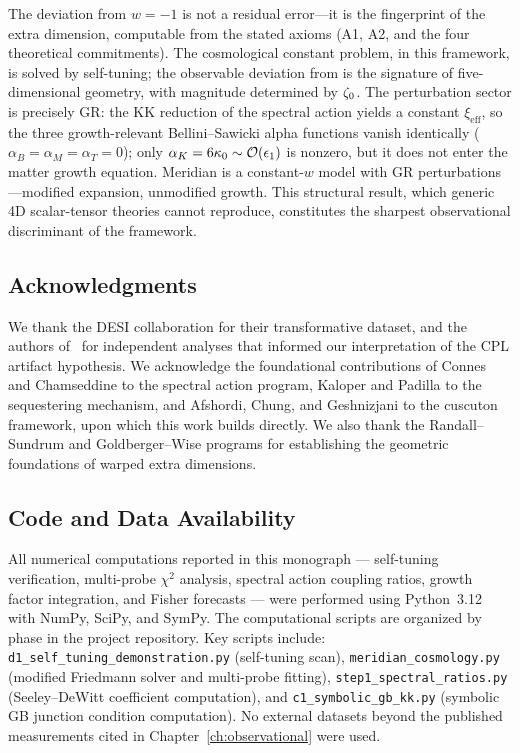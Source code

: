 The deviation from $w = -1$ is not a residual error---it is the fingerprint of the extra dimension, computable from the stated axioms (A1, A2, and the four theoretical commitments). The cosmological constant problem, in this framework, is solved by self-tuning; the observable deviation from \LCDM{} is the signature of five-dimensional geometry, with magnitude determined by $\zeta_0$. The perturbation sector is precisely GR: the KK reduction of the spectral action yields a constant $\xi_{\mathrm{eff}}$, so the three growth-relevant Bellini--Sawicki alpha functions vanish identically ($\alpha_B = \alpha_M = \alpha_T = 0$); only $\alpha_K = 6\kappa_0 \sim \mathcal{O}\!\left(\epsilon_1\right)$ is nonzero, but it does not enter the matter growth equation. Meridian is a constant-$w$ model with GR perturbations---modified expansion, unmodified growth. This structural result, which generic 4D scalar-tensor theories cannot reproduce, constitutes the sharpest observational discriminant of the framework.

\bigskip

\subsection*{Acknowledgments}

We thank the DESI collaboration for their transformative dataset, and the authors of~\cite{ch1:nesseris25,ch1:gomez25,ch1:lodha24,ch1:hasan25,ch1:mandal25,ch1:andrianomena25,ch1:marques25} for independent analyses that informed our interpretation of the CPL artifact hypothesis. We acknowledge the foundational contributions of Connes and Chamseddine to the spectral action program, Kaloper and Padilla to the sequestering mechanism, and Afshordi, Chung, and Geshnizjani to the cuscuton framework, upon which this work builds directly. We also thank the Randall--Sundrum and Goldberger--Wise programs for establishing the geometric foundations of warped extra dimensions.

\subsection*{Code and Data Availability}

All numerical computations reported in this monograph --- self-tuning verification, multi-probe $\chi^2$ analysis, spectral action coupling ratios, growth factor integration, and Fisher forecasts --- were performed using Python~3.12 with NumPy, SciPy, and SymPy. The computational scripts are organized by phase in the project repository. Key scripts include: \texttt{d1\_self\_tuning\_demonstration.py} (self-tuning scan), \texttt{meridian\_cosmology.py} (modified Friedmann solver and multi-probe fitting), \texttt{step1\_spectral\_ratios.py} (Seeley--DeWitt coefficient computation), and \texttt{c1\_symbolic\_gb\_kk.py} (symbolic GB junction condition computation). No external datasets beyond the published measurements cited in Chapter~\ref{ch:observational} were used.


